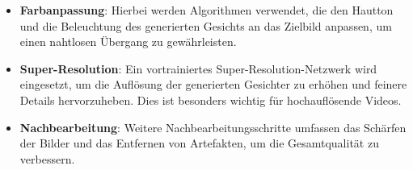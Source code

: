 \begin{itemize}
    \item \textbf{Farbanpassung}: Hierbei werden Algorithmen verwendet, die den Hautton und die Beleuchtung des generierten Gesichts an das Zielbild anpassen, um einen nahtlosen Übergang zu gewährleisten.
    \item \textbf{Super-Resolution}: Ein vortrainiertes Super-Resolution-Netzwerk wird eingesetzt, um die Auflösung der generierten Gesichter zu erhöhen und feinere Details hervorzuheben. 
     Dies ist besonders wichtig für hochauflösende Videos.
    \item \textbf{Nachbearbeitung}: Weitere Nachbearbeitungsschritte umfassen das Schärfen der Bilder und das Entfernen von Artefakten, um die Gesamtqualität zu verbessern.
\end{itemize}